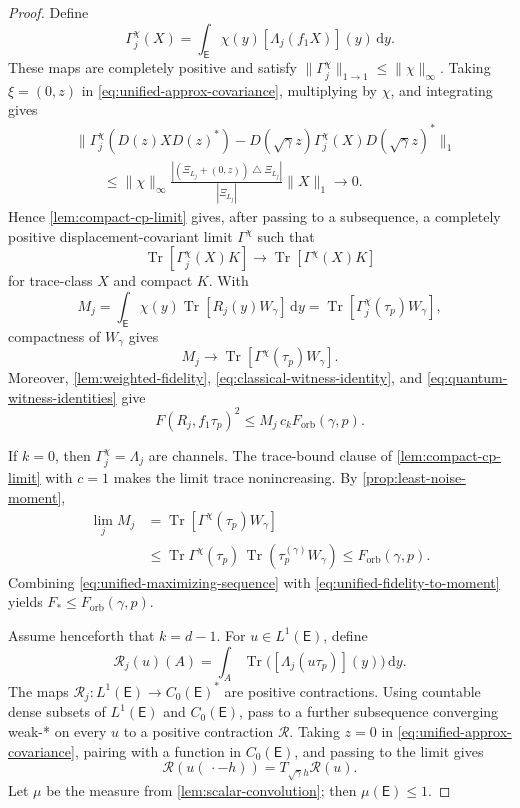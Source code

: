 \documentclass[11pt]{article}
\theoremstyle{remark}
\theoremstyle{plain}
\newcommand{\dd}{\mathrm d}
\newcommand{\Tr}{\operatorname{Tr}}
\newcommand{\Forb}{F_{\mathrm{orb}}}
\begin{document}
\begin{proof}
Define
\[
  \Gamma_j^\chi(X)
  =\int_{\mathsf E}\chi(y)[\Lambda_j(f_1X)](y)\,\dd y.
\]
These maps are completely positive and satisfy
\(\|\Gamma_j^\chi\|_{1\to1}\le\|\chi\|_\infty\).  Taking
\(\xi=(0,z)\) in \eqref{eq:unified-approx-covariance}, multiplying by
\(\chi\), and integrating gives
\[
\begin{aligned}
 &\|\Gamma_j^\chi(D(z)XD(z)^*)
   -D(\sqrt\gamma z)\Gamma_j^\chi(X)D(\sqrt\gamma z)^*\|_1\\
 &\qquad\le\|\chi\|_\infty
   \frac{|(\Xi_{L_j}+(0,z))\mathbin\triangle\Xi_{L_j}|}{|\Xi_{L_j}|}
   \|X\|_1\longrightarrow0.
\end{aligned}
\]
Hence \cref{lem:compact-cp-limit} gives, after passing to a subsequence, a
completely positive displacement-covariant limit \(\Gamma^\chi\) such that
\begin{equation}\label{eq:weighted-map-limit}
  \Tr[\Gamma_j^\chi(X)K]
  \longrightarrow\Tr[\Gamma^\chi(X)K]
\end{equation}
for trace-class \(X\) and compact \(K\).  With
\[
  M_j
  =\int_{\mathsf E}\chi(y)\Tr[R_j(y)W_\gamma] \,\dd y
  =\Tr[\Gamma_j^\chi(\tau_p)W_\gamma],
\]
compactness of \(W_\gamma\) gives
\begin{equation}\label{eq:moment-limit}
  M_j\longrightarrow\Tr[\Gamma^\chi(\tau_p)W_\gamma].
\end{equation}
Moreover, \cref{lem:weighted-fidelity},
\eqref{eq:classical-witness-identity}, and
\eqref{eq:quantum-witness-identities} give
\begin{equation}\label{eq:unified-fidelity-to-moment}
  F(R_j,f_1\tau_p)^2
  \le M_j\,c_k\Forb(\gamma,p).
\end{equation}

If \(k=0\), then \(\Gamma_j^\chi=\Lambda_j\) are channels.  The trace-bound
clause of \cref{lem:compact-cp-limit} with \(c=1\) makes the limit trace
nonincreasing.  By
\cref{prop:least-noise-moment},
\[
\begin{aligned}
  \lim_j M_j
  &=\Tr[\Gamma^\chi(\tau_p)W_\gamma]\\
  &\le\Tr\Gamma^\chi(\tau_p)\,
       \Tr(\tau_p^{(\gamma)}W_\gamma)
  \le\Forb(\gamma,p).
\end{aligned}
\]
Combining \eqref{eq:unified-maximizing-sequence} with
\eqref{eq:unified-fidelity-to-moment} yields
\(F_*\le\Forb(\gamma,p)\).

Assume henceforth that \(k=d-1\).  For \(u\in L^1(\mathsf E)\), define
\[
  \mathcal R_j(u)(A)
  =\int_A\Tr\bigl([\Lambda_j(u\tau_p)](y)\bigr)\,\dd y.
\]
The maps \(\mathcal R_j:L^1(\mathsf E)\to C_0(\mathsf E)^*\) are positive
contractions.  Using countable dense subsets of \(L^1(\mathsf E)\) and
\(C_0(\mathsf E)\), pass to a further subsequence converging weak-* on every \(u\)
to a positive contraction \(\mathcal R\).  Taking \(z=0\) in
\eqref{eq:unified-approx-covariance}, pairing with a function in
\(C_0(\mathsf E)\), and passing to the limit gives
\[
  \mathcal R(u(\,\cdot-h))
  =T_{\sqrt\gamma h}\mathcal R(u).
\]
Let \(\mu\) be the measure from \cref{lem:scalar-convolution}; then
\(\mu(\mathsf E)\le1\).


\end{proof}
\end{document}

